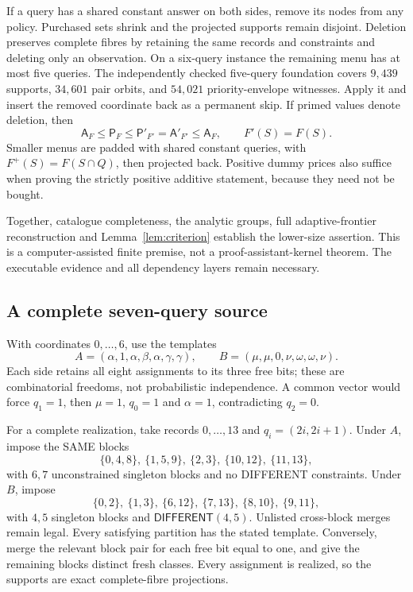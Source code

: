 \documentclass[pdflatex,sn-mathphys-num]{sn-jnl}
\newcommand{\A}{\mathsf{A}}
\newcommand{\Pcost}{\mathsf{P}}
\newcommand{\DIFF}{\mathsf{DIFFERENT}}
\theoremstyle{thmstyleone}
\theoremstyle{thmstylethree}
\theoremstyle{thmstyletwo}
\begin{document}
If a query has a shared constant answer on both sides, remove its nodes from any policy. Purchased sets shrink and the projected supports remain disjoint. Deletion preserves complete fibres by retaining the same records and constraints and deleting only an observation. On a six-query instance the remaining menu has at most five queries. The independently checked five-query foundation covers $9,439$ supports, $34,601$ pair orbits, and $54,021$ priority-envelope witnesses. Apply it and insert the removed coordinate back as a permanent skip. If primed values denote deletion, then
\[
 \A_F\leq\Pcost_F\leq\Pcost'_{F'}=\A'_{F'}\leq\A_F,
 \qquad F'(S)=F(S).
\]
Smaller menus are padded with shared constant queries, with $F^+(S)=F(S\cap Q)$, then projected back. Positive dummy prices also suffice when proving the strictly positive additive statement, because they need not be bought.

Together, catalogue completeness, the analytic groups, full adaptive-frontier reconstruction and Lemma~\ref{lem:criterion} establish the lower-size assertion. This is a computer-assisted finite premise, not a proof-assistant-kernel theorem. The executable evidence and all dependency layers remain necessary.

\subsection{A complete seven-query source}\label{sec:seven}
With coordinates $0,\ldots,6$, use the templates
\[
 A=(\alpha,1,\alpha,\beta,\alpha,\gamma,\gamma),\qquad
 B=(\mu,\mu,0,\nu,\omega,\omega,\nu).
\]
Each side retains all eight assignments to its three free bits; these are combinatorial freedoms, not probabilistic independence. A common vector would force $q_1=1$, then $\mu=1$, $q_0=1$ and $\alpha=1$, contradicting $q_2=0$.

For a complete realization, take records $0,\ldots,13$ and $q_i=(2i,2i+1)$. Under $A$, impose the SAME blocks
\[
 \{0,4,8\},\ \{1,5,9\},\ \{2,3\},\ \{10,12\},\ \{11,13\},
\]
with $6,7$ unconstrained singleton blocks and no DIFFERENT constraints. Under $B$, impose
\[
 \{0,2\},\ \{1,3\},\ \{6,12\},\ \{7,13\},\ \{8,10\},\ \{9,11\},
\]
with $4,5$ singleton blocks and $\DIFF(4,5)$. Unlisted cross-block merges remain legal. Every satisfying partition has the stated template. Conversely, merge the relevant block pair for each free bit equal to one, and give the remaining blocks distinct fresh classes. Every assignment is realized, so the supports are exact complete-fibre projections.
\end{document}
